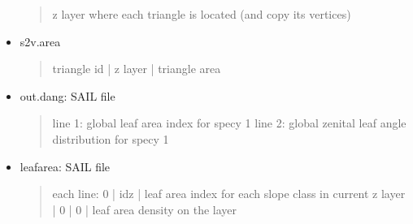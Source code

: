 \documentclass[letterpaper,10pt,english]{sphinxmanual}
\begin{document}
\begin{fulllineitems}
\begin{fulllineitems}
\begin{itemize}
\begin{quote}
\sphinxAtStartPar
z layer where each triangle is located (and copy its vertices)
\end{quote}

\item {} 
\sphinxAtStartPar
s2v.area
\begin{quote}

\sphinxAtStartPar
triangle id | z layer | triangle area
\end{quote}

\item {} 
\sphinxAtStartPar
out.dang: SAIL file
\begin{quote}

\sphinxAtStartPar
line 1: global leaf area index for specy 1
line 2: global zenital leaf angle distribution for specy 1
\end{quote}

\item {} 
\sphinxAtStartPar
leafarea: SAIL file
\begin{quote}

\sphinxAtStartPar
each line: 0 | idz | leaf area index for each slope class in current z layer | 0 | 0 | leaf area density on the layer
\end{quote}

\end{itemize}

\sphinxAtStartPar
{}

\begin{sphinxVerbatim}[commandchars=\\\{\}]
 
   
    \PYG{p}{[}\PYG{p}{]}   
 
\end{sphinxVerbatim}

\end{fulllineitems}



\end{fulllineitems}
\end{document}
